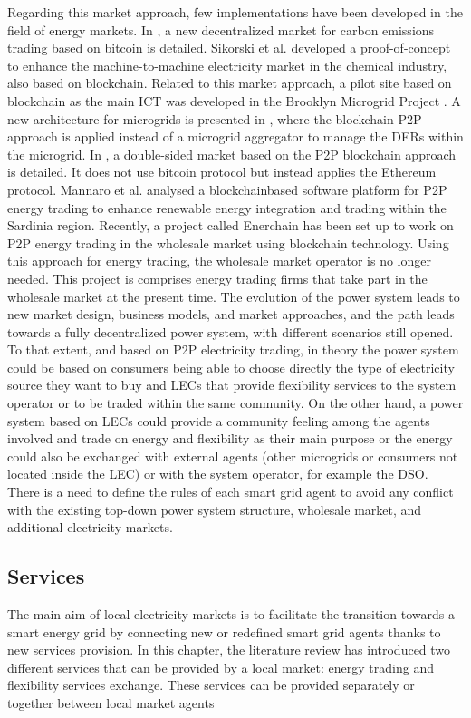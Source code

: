 Regarding this market approach, few implementations have been developed in the field of energy markets. In \cite{al2015bitcoin}, a new decentralized market for carbon emissions trading based on bitcoin is detailed. Sikorski et al. \cite{sikorski2017blockchain} developed a proof-of-concept to enhance the machine-to-machine electricity market in the chemical industry, also based on blockchain. Related to this market approach, a pilot site based on blockchain as the main ICT was developed in the Brooklyn Microgrid Project \cite{mengelkamp2018designing}. A new architecture for microgrids is presented in \cite{munsing2017blockchains}, where the blockchain P2P approach is applied instead of a microgrid aggregator to manage the DERs within the microgrid. In \cite{mengelkamp2018blockchain}, a double-sided market based on the P2P blockchain approach is detailed. It does not use bitcoin protocol but instead applies the Ethereum protocol. Mannaro et al. \cite{mannaro2017crypto} analysed a blockchainbased software platform for P2P energy trading to enhance renewable energy integration and trading within the Sardinia region. Recently, a project called Enerchain \cite{Enerchain} has been set up to work on P2P energy trading in the wholesale market using blockchain technology. Using this approach for energy trading, the wholesale market operator is no longer needed. This project is comprises energy trading firms that take part in the wholesale market at the present time. The evolution of the power system leads to new market design, business models, and market approaches, and the path leads towards a fully decentralized power system, with different scenarios still opened. To that extent, and based on P2P electricity trading, in theory the power system could be based on consumers being able to choose directly the type of electricity source they want to buy and LECs that provide flexibility services to the system operator or to be traded within the same community. On the other hand, a power system based on LECs could provide a community feeling among the agents involved and trade on energy and flexibility as their main purpose or the energy could also be exchanged with external agents (other microgrids or consumers not located inside the LEC) or with the system operator, for example the DSO. There is a need to define the rules of each smart grid agent to avoid any conflict with the existing top-down power system structure, wholesale market, and additional electricity markets.


\subsection{Services}
The main aim of local electricity markets is to facilitate the transition towards a smart energy grid by connecting new or redefined smart grid agents thanks to new services provision. In this chapter, the literature review has introduced two different services that can be provided by a local market: energy trading and flexibility services exchange. These services can be provided separately or together between local market agents 


